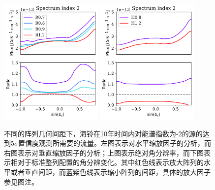 \begin{figure}[!htb]%
    \centering
    \includegraphics[width=0.45\textwidth]{img/spacing/source_sensitivity_2_hori.pdf}
    \includegraphics[width=0.45\textwidth]{img/spacing/source_sensitivity_2_vert.pdf}
    \caption{不同的阵列几何间距下，海铃在10年时间内对能谱指数为-2的源的达到$5\sigma$置信度观测所需要的流量。左图表示对水平缩放因子的分析，而右图表示对垂直缩放因子的分析；上图表示绝对角分辨率，而下图表示相对于标准整列配置的角分辨变化。其中红色线表示放大阵列的水平或者垂直间距，而蓝紫色线表示缩小阵列的间距，具体的放大因子参见图注。}
    \label{fig:spacing_source_sensitivity_2}
\end{figure}

